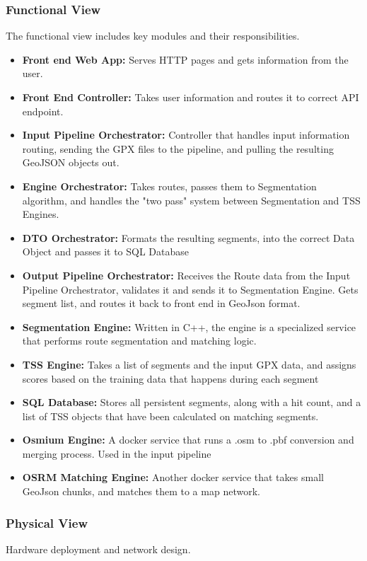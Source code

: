 \documentclass[11pt,a4paper]{report}
\begin{document}
\subsubsection{Functional View}
The functional view includes key modules and their responsibilities.
\begin{itemize}
	\item \textbf{Front end Web App:} Serves HTTP pages and gets information from the user.
	\item \textbf{Front End Controller:} Takes user information and routes it to correct API endpoint.
	\item \textbf{Input Pipeline Orchestrator:} Controller that handles input information routing, sending the GPX files to the pipeline, and pulling the resulting GeoJSON objects out.
	\item \textbf{Engine Orchestrator:} Takes routes, passes them to Segmentation algorithm, and handles the "two pass" system between Segmentation and TSS Engines.
	\item \textbf{DTO Orchestrator:} Formats the resulting segments, into the correct Data Object and passes it to SQL Database
	\item \textbf{Output Pipeline Orchestrator:} Receives the Route data from the Input Pipeline Orchestrator, validates it and sends it to Segmentation Engine. Gets segment list, and routes it back to front end in GeoJson format.
	\item \textbf{Segmentation Engine:} Written in C++, the engine is a specialized service that performs route segmentation and matching logic.
	\item \textbf{TSS Engine:} Takes a list of segments and the input GPX data, and assigns scores based on the training data that happens during each segment
	\item \textbf{SQL Database:} Stores all persistent segments, along with a hit count, and a list of TSS objects that have been calculated on matching segments.
	\item \textbf{Osmium Engine:} A docker service that runs a .osm to .pbf conversion and merging process. Used in the input pipeline
	\item \textbf{OSRM Matching Engine:} Another docker service that takes small GeoJson chunks, and matches them to a map network.
\end{itemize}

\subsubsection{Physical View}
Hardware deployment and network design.
\end{document}
